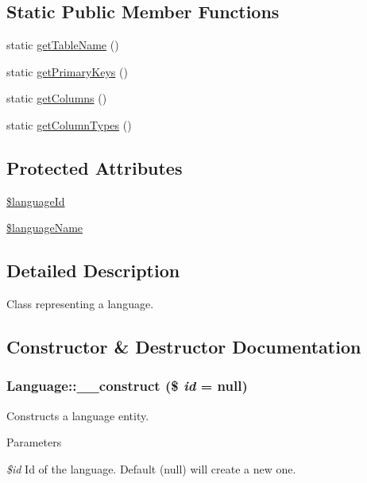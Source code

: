 \subsection*{Static Public Member Functions}
\begin{DoxyCompactItemize}
\item 
static \hyperlink{classLanguage_a262653445a1324d6c02099e01cab0dff}{getTableName} ()
\item 
static \hyperlink{classLanguage_ad85ca28f29f19ec96d0151d21a2485a6}{getPrimaryKeys} ()
\item 
static \hyperlink{classLanguage_aca9b17402d92635b3092d255ca90e551}{getColumns} ()
\item 
static \hyperlink{classLanguage_a6e5cf86376e603ee4945b514fb6de7bd}{getColumnTypes} ()
\end{DoxyCompactItemize}
\subsection*{Protected Attributes}
\begin{DoxyCompactItemize}
\item 
\hyperlink{classLanguage_a3074b0c6617cb91c7e31ccb3faf33908}{\$languageId}
\item 
\hyperlink{classLanguage_a668d1ca7b67b40b4f8d001e2e1480dc3}{\$languageName}
\end{DoxyCompactItemize}


\subsection{Detailed Description}
Class representing a language. 

\subsection{Constructor \& Destructor Documentation}
\hypertarget{classLanguage_abc1d723ee7724d0b7a6b27914e8e6d55}{
\subsubsection[{\_\-\_\-construct}]{\setlength{\rightskip}{0pt plus 5cm}Language::\_\-\_\-construct (\$ {\em id} = {\ttfamily null})}}
\label{classLanguage_abc1d723ee7724d0b7a6b27914e8e6d55}
Constructs a language entity.


\begin{DoxyParams}{Parameters}
\item[{\em \$id}]Id of the language. Default (null) will create a new one. \end{DoxyParams}


